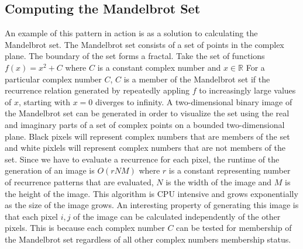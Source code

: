 \subsection{Computing the Mandelbrot Set}
An example of this pattern in action is as a solution to calculating the Mandelbrot set.
The Mandelbrot set consists of a set of points in the complex plane. The boundary of the set forms a fractal.
Take the set of functions \begin{math}f(x)=x^2 + C\end{math} where \begin{math}C\end{math} is a constant complex number
and \begin{math}x \in \mathbb{R}\end{math} 
For a particular complex number \begin{math}C\end{math}, \begin{math}C\end{math} is a member of the Mandelbrot set if
the recurrence relation generated by repeatedly appling \begin{math}f\end{math} to increasingly large values of \begin{math}x\end{math}, starting with \begin{math}x=0\end{math} diverges to infinity. 
A two-dimensional binary image of the Mandelbrot set can be generated in order to visualize the set using the real and imaginary parts of a set of 
complex points on a bounded two-dimensional plane. 
Black pixels will represent complex numbers that are members of the set and white pixlels will represent complex numbers that are not members of the set.
Since we have to evaluate a recurrence for each pixel, the runtime of the generation of an image is \begin{math}O(rNM)\end{math} where \begin{math}r\end{math} is a constant representing number of recurrence patterns that are evaluated, \begin{math}N\end{math} is the width of the image and \begin{math}M\end{math} is the height of the image.
This algorithm is CPU intensive and grows exponentially as the size of the image grows. 
An interesting property of generating this image is that each pixel \begin{math}i,j\end{math} of the image can be calculated independently of the other pixels.
This is because each complex number \begin{math}C\end{math} can be tested for membership of the Mandelbrot set regardless of all other complex numbers membership status.
 
